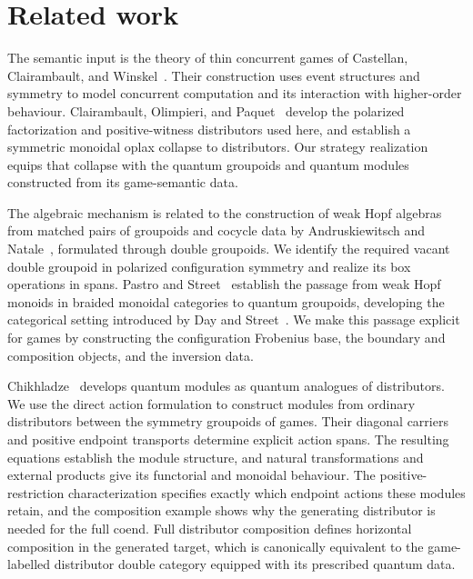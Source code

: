 \documentclass[oneside]{article}
\theoremstyle{plain}
\theoremstyle{definition}
\theoremstyle{remark}
\begin{document}
\section{Related work}
\label{sec:cgqg-related-work}

The semantic input is the theory of thin concurrent games of Castellan,
Clairambault, and Winskel~\cite{CastellanClairambaultWinskel2019}. Their
construction uses event structures and symmetry to model concurrent
computation and its interaction with higher-order behaviour.
Clairambault, Olimpieri, and
Paquet~\cite{ClairambaultOlimpieriPaquet2025} develop the polarized
factorization and positive-witness distributors used here, and establish
a symmetric monoidal oplax collapse to distributors. Our strategy
realization equips that collapse with the quantum groupoids and quantum
modules constructed from its game-semantic data.

The algebraic mechanism is related to the construction of weak Hopf
algebras from matched pairs of groupoids and cocycle data by
Andruskiewitsch and Natale~\cite{AndruskiewitschNatale2005}, formulated
through double groupoids. We identify the required vacant double
groupoid in polarized configuration symmetry and realize its box
operations in spans. Pastro and Street~\cite{PastroStreet2009} establish
the passage from weak Hopf monoids in braided monoidal categories to
quantum groupoids, developing the categorical setting introduced by Day
and Street~\cite{DayStreet2004}. We make this passage explicit for games
by constructing the configuration Frobenius base, the boundary and
composition objects, and the inversion data.

Chikhladze~\cite{Chikhladze2010QuantumModules} develops quantum modules
as quantum analogues of distributors. We use the direct action
formulation to construct modules from ordinary distributors between the
symmetry groupoids of games. Their diagonal carriers and positive
endpoint transports determine explicit action spans. The resulting
equations establish the module structure, and natural transformations
and external products give its functorial and monoidal behaviour. The positive-restriction characterization specifies exactly which
endpoint actions these modules retain, and the composition example
shows why the generating distributor is needed for the full coend.
Full distributor composition defines horizontal composition in the
generated target, which is canonically equivalent to the game-labelled
distributor double category equipped with its prescribed quantum data.
\end{document}
